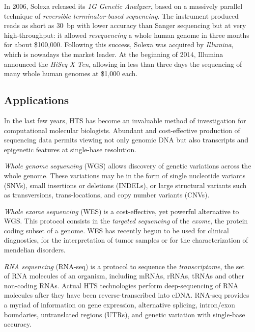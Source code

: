 In 2006, Solexa released its \emph{1G Genetic Analyzer}, based on a massively parallel technique of \emph{reversible terminator-based sequencing}.
The instrument produced reads as short as 30~bp with lower accuracy than Sanger sequencing but at very high-throughput: it allowed \emph{resequencing} a whole human genome in three months for about \$100,000.
Following this success, Solexa was acquired by \emph{Illumina}, which is nowadays the market leader.
At the beginning of 2014, Illumina announced the \emph{HiSeq X Ten}, allowing in less than three days the sequencing of many whole human genomes at \$1,000 each.

\subsection{Applications}

In the last few years, HTS has become an invaluable method of investigation for computational molecular biologists.
Abundant and cost-effective production of sequencing data permits viewing not only genomic DNA but also transcripts and epigenetic features at single-base resolution.

\emph{Whole genome sequencing} (WGS) allows discovery of genetic variations across the whole genome.
These variations may be in the form of single nucleotide variants (SNVs), small insertions or deletions (INDELs), or large structural variants such as transversions, trans-locations, and copy number variants (CNVs).

\emph{Whole exome sequencing} (WES) is a cost-effective, yet powerful alternative to WGS.
This protocol consists in the \emph{targeted sequencing} of the \emph{exome}, \ie the protein coding subset of a genome.
WES has recently begun to be used for clinical diagnostics, \eg for the interpretation of tumor samples or for the characterization of mendelian disorders.

\emph{RNA sequencing} (RNA-seq) is a protocol to sequence the \emph{transcriptome}, \ie the set of RNA molecules of an organism, including mRNAs, rRNAs, tRNAs and other non-coding RNAs.
Actual HTS technologies perform deep-sequencing of RNA molecules after they have been reverse-transcribed into cDNA.
RNA-seq provides a myriad of information on gene expression, alternative splicing, intron/exon boundaries, untranslated regions (UTRs), and genetic variation with single-base accuracy.

